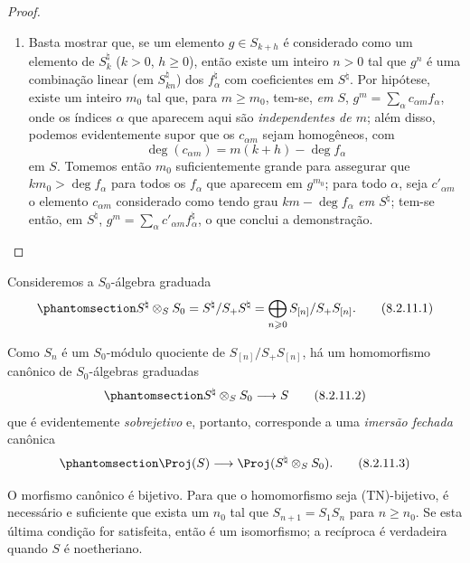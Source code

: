\documentclass[oneside,10pt]{amsart}
\makeatletter
\renewcommand{\geq}{\geqslant}
\newcommand{\ega@arrow}[2]{\mathchoice{#1}{#2}{#2}{#2}}
\renewcommand{\to}{\ega@arrow{\longrightarrow}{\rightarrow}}
\newcommand{\oldpage}[2][]{\marginnote{\normalfont\footnotesize\textbf{#1}~|~#2}\ignorespaces}
\let\EGAOriginalLabel\label
\renewcommand{\label}[1]{\phantomsection\EGAOriginalLabel{#1}}
\makeatother
\begin{document}
\begin{proof}
\begin{enumerate}
    a igualdade $S_n^\natural=S_1^{\natural n}$ implica, portanto, que $S_n=S_1^n$.
  \item[\rm{(iv)}] Basta mostrar que, se um elemento $g\in S_{k+h}$ é considerado como um elemento de $S_k^\natural$ ($k>0$, $h\geq0$), então existe um inteiro $n>0$ tal que $g^n$ é uma combinação linear (em $S_{kn}^\natural$) dos $f_\alpha^\natural$ com coeficientes em $S^\natural$.
    Por hipótese, existe um inteiro $m_0$ tal que, para $m\geq m_0$, tem-se, \emph{em $S$}, $g^m = \sum_\alpha c_{\alpha m}f_\alpha$, onde os índices $\alpha$ que aparecem aqui são \emph{independentes de $m$};
    além disso, podemos evidentemente supor que os $c_{\alpha m}$ sejam homogêneos, com
    \[
      \deg(c_{\alpha m}) = m(k+h)-\deg f_\alpha
    \]
    em $S$.
    Tomemos então $m_0$ suficientemente grande para assegurar que $km_0>\deg f_\alpha$ para todos os $f_\alpha$ que aparecem em $g^{m_0}$;
    para todo $\alpha$, seja $c'_{\alpha m}$ o elemento $c_{\alpha m}$ considerado como tendo grau $km-\deg f_\alpha$ \emph{em $S^\natural$};
    tem-se então, em $S^\natural$, $g^m = \sum_\alpha c'_{\alpha m}f_\alpha^\natural$, o que conclui a demonstração.
\end{enumerate}
\end{proof}

\begin{env}[8.2.11]
\label{II.8.2.11}
Consideremos a $S_0$-álgebra graduada
\[
\label{II.8.2.11.1}
  S^\natural \otimes_S S_0
  =
  S^\natural/S_+S^\natural
  =
  \bigoplus_{n\geq0} S_{[n]}/S_+S_{[n]}.
\tag{8.2.11.1}
\]

Como $S_n$ é um $S_0$-módulo quociente de $S_{[n]}/S_+S_{[n]}$, há um homomorfismo canônico de $S_0$-álgebras graduadas
\[
\label{II.8.2.11.2}
  S^\natural \otimes_S S_0 \to S
\tag{8.2.11.2}
\]
que é evidentemente \emph{sobrejetivo} e, portanto, corresponde  a uma \emph{imersão fechada} canônica
\[
\label{II.8.2.11.3}
  \Proj(S) \to \Proj(S^\natural \otimes_S S_0).
\tag{8.2.11.3}
\]
\end{env}

\oldpage[II]{161}
\begin{proposition}[8.2.12]
\label{II.8.2.12}
O morfismo canônico  é bijetivo.
Para que o homomorfismo  seja (TN)-bijetivo, é necessário e suficiente que exista um $n_0$ tal que $S_{n+1}=S_1S_n$ para $n\geq n_0$.
Se esta última condição for satisfeita, então  é um isomorfismo;
a recíproca é verdadeira quando $S$ é noetheriano.
\end{proposition}
\end{document}
